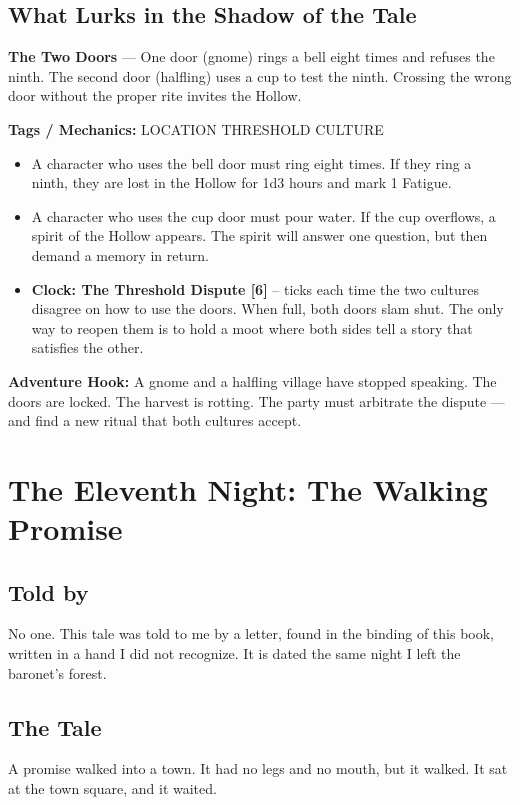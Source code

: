 \documentclass[10pt,twoside]{book}
\newcommand{\tag}[1]{\textsc{#1}}
\begin{document}
\section*{What Lurks in the Shadow of the Tale}
\begin{infobox}
\textbf{The Two Doors} --- One door (gnome) rings a bell eight times and refuses the ninth. The second door (halfling) uses a cup to test the ninth. Crossing the wrong door without the proper rite invites the Hollow.

\textbf{Tags / Mechanics:} \tag{LOCATION} \tag{THRESHOLD} \tag{CULTURE}

\begin{itemize}
\item A character who uses the bell door must ring eight times. If they ring a ninth, they are lost in the Hollow for 1d3 hours and mark 1 Fatigue.
\item A character who uses the cup door must pour water. If the cup overflows, a spirit of the Hollow appears. The spirit will answer one question, but then demand a memory in return.
\item \textbf{Clock: The Threshold Dispute [6]} -- ticks each time the two cultures disagree on how to use the doors. When full, both doors slam shut. The only way to reopen them is to hold a moot where both sides tell a story that satisfies the other.
\end{itemize}

\textbf{Adventure Hook:} A gnome and a halfling village have stopped speaking. The doors are locked. The harvest is rotting. The party must arbitrate the dispute --- and find a new ritual that both cultures accept.
\end{infobox}

\chapter{The Eleventh Night: The Walking Promise}

\section*{Told by}
No one. This tale was told to me by a letter, found in the binding of this book, written in a hand I did not recognize. It is dated the same night I left the baronet's forest.

\section*{The Tale}
A promise walked into a town. It had no legs and no mouth, but it walked. It sat at the town square, and it waited.
\end{document}
